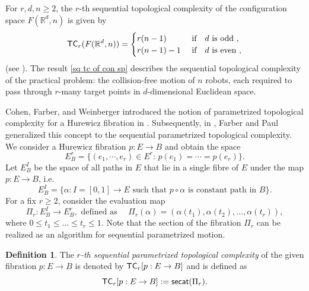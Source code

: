 \documentclass[12pt,oneside,reqno]{amsart}
\theoremstyle{plain}
\theoremstyle{definition}
\newtheorem{definition}[theorem]{Definition}
\theoremstyle{remark}
\newcommand{\secat}{{\sf {secat}}}
\newcommand{\TC}{{\sf {TC}}}
\newcommand{\rr}{{\mathbb {R}}}
\begin{document}
For $r,d,n\geq 2$, the $r$-th sequential topological complexity of the configuration space $F(\rr^d, n)$ %
is given by
\begin{equation}\label{sq tc of con sp}
\TC_r(F(\rr^d, n)) = 
\begin{cases}
r(n-1) & \mbox{ if } ~~ d \mbox{ is odd },\\
r(n-1)-1 &\mbox{ if } ~~ d \mbox{ is even },
\end{cases}
\end{equation}
(see \cite[Theorem 4.1]{GonG15}).
The result \eqref{sq tc of con sp} describes the sequential topological complexity of the practical problem: the collision-free motion of $n$ robots, each required to pass through $r$-many target points in $d$-dimensional Euclidean space.

Cohen, Farber, and Weinberger introduced the notion of parametrized topological complexity for a Hurewicz fibration in \cite{CohFW21}. Subsequently, in \cite{FarP22}, Farber and Paul generalized this concept to the sequential parametrized topological complexity. We consider a Hurewicz fibration $p: E \to B$ and obtain the space
\begin{equation}\label{Eq_ErB}
E^r_B= \{(e_1, \cdots, e_r)\in E^r: \, p(e_1)=\cdots = p(e_r)\}.
\end{equation}
Let $E^I_B$ be the space of all paths in $E$ that lie in a single fibre of $E$ under the map $p\colon E\to B$, i.e. 
\begin{equation*}
 E^I_B=\{\alpha: I = [0,1]\to E \text{ such that } p\circ \alpha \text{ is constant path in } B\}.
\end{equation*}
For a fix $r \ge 2$, consider the evaluation map 
\begin{equation*}
\Pi_r : E^I_B \to E^r_B, \text{ defined as } \quad \Pi_r(\alpha) = (\alpha(t_1), \alpha(t_2), \dots,  \alpha(t_r)),
\end{equation*} 
where $0\leq t_1\leq \ldots \leq t_r\leq 1$. Note that the section of the fibration $\Pi_r$ can be realized as an algorithm for sequential parametrized motion. 

\begin{definition} \label{definition sequential parametrized topological complexity}
The \emph{$r$-th sequential parametrized topological complexity} of the given fibration $p : E \to B$ is denoted by $\TC_r[p : E \to B]$ and is defined as 
$$\TC_r[p : E \to B]:=\secat(\Pi_r).$$
\end{definition}
\end{document}
